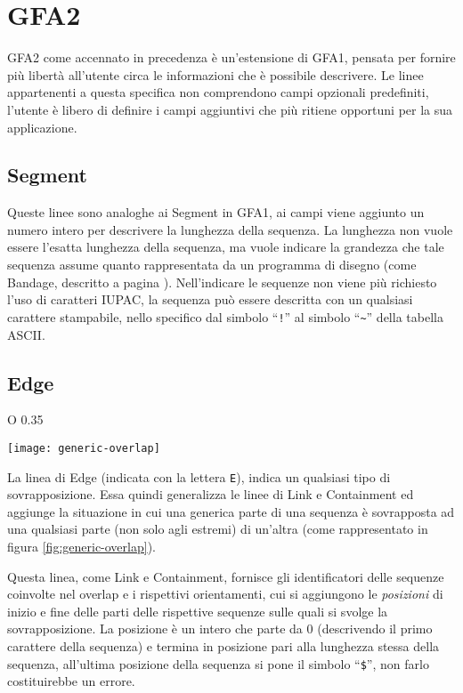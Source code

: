\section{GFA2}
GFA2 come accennato in precedenza è un'estensione di GFA1, pensata
per fornire più libertà all'utente circa le informazioni che è possibile descrivere.
Le linee appartenenti a questa specifica non comprendono campi opzionali
predefiniti, l'utente è libero di definire i campi aggiuntivi che più ritiene opportuni
per la sua applicazione.


\subsection{Segment}
Queste linee sono analoghe ai Segment in GFA1, ai campi viene aggiunto
un numero intero per descrivere la lunghezza della sequenza.
La lunghezza non vuole essere l'esatta lunghezza della sequenza, ma
vuole indicare la grandezza che tale sequenza assume quanto rappresentata
da un programma di disegno (come Bandage, descritto a pagina \pageref{sec:bandage}).
Nell'indicare le sequenze non viene più richiesto l'uso di caratteri IUPAC\cite{wiki:acid-notation},
la sequenza può essere descritta con un qualsiasi carattere stampabile,
nello specifico dal simbolo ``\texttt{!}'' al simbolo ``\texttt{\textasciitilde}''
della tabella ASCII.

\subsection{Edge}
\begin{wrapfigure} {O} {0.35\textwidth}
	\begin{centering}	
		\texttt{[image: generic-overlap]}
		\caption[Rappresentazione di una situazione generica di sovrapposizione fra sequenze]
		{Una rappresentazione grafica di una generica di sovrapposizione fra sequenze.}
		\label{fig:generic-overlap}
	\end{centering}
\end{wrapfigure}
La linea di Edge (indicata con la lettera \texttt{E}), indica un qualsiasi
tipo di sovrapposizione. Essa quindi generalizza le linee di Link e Containment
ed aggiunge la situazione in cui una generica parte di una sequenza
è sovrapposta ad una qualsiasi parte (non solo agli estremi) di
un'altra (come rappresentato in figura \ref{fig:generic-overlap}).

Questa linea, come Link e Containment, fornisce gli identificatori
delle sequenze coinvolte nel overlap e i rispettivi orientamenti, cui
si aggiungono le \emph{posizioni} di inizio e fine delle parti
delle rispettive sequenze sulle quali si svolge la sovrapposizione.
La posizione è un intero che parte da 0 (descrivendo il primo
carattere della sequenza) e termina in posizione pari alla
lunghezza stessa della sequenza, all'ultima posizione della sequenza
si pone il simbolo ``\texttt{\$}'', non farlo costituirebbe un errore.


